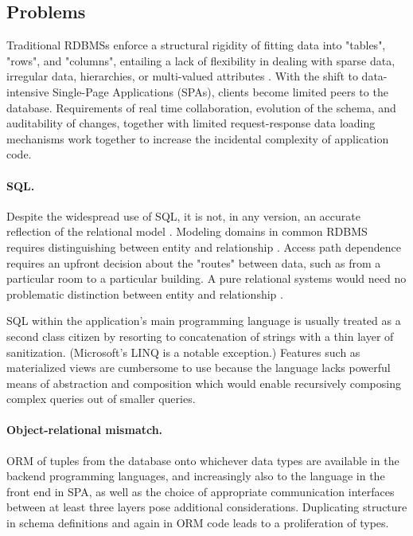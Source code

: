 \subsection{Problems}

Traditional RDBMSs enforce a structural rigidity of fitting data into "tables", "rows", and "columns", entailing a lack of flexibility in dealing with sparse data, irregular data, hierarchies, or multi-valued attributes \cite{hickey2012dbvalue}. With the shift to data-intensive Single-Page Applications (SPAs), clients become limited peers to the database. Requirements of real time collaboration, evolution of the schema, and auditability of changes, together with limited request-response data loading mechanisms work together to increase the incidental complexity of application code.


\paragraph{\gls{SQL}.}
Despite the widespread use of SQL, it is not, in any version, an accurate reflection of the relational model \cite{codd1990relational} \cite{tarpit}.
Modeling domains in common \gls{RDBMS} requires distinguishing between entity and relationship \cite{chen1976entity}. Access path dependence requires an upfront decision about the "routes" between data, such as from a particular room to a particular building. A pure relational systems would need no problematic distinction between entity and relationship \cite{tarpit}.

SQL within the application's main programming language is usually treated as a second class citizen by resorting to concatenation of strings with a thin layer of sanitization. (Microsoft's LINQ \cite{meijer2006linq} is a notable exception.) Features such as materialized views are cumbersome to use because the language lacks powerful means of abstraction and composition \cite{sicp} which would enable recursively composing complex queries out of smaller queries.

\paragraph{Object-relational mismatch.}
\gls{ORM} of tuples from the database onto whichever data types are available in the backend programming languages, and increasingly also to the language in the front end in \gls{SPA}, as well as the choice of appropriate communication interfaces between at least three layers pose additional considerations. Duplicating structure in schema definitions and again in ORM code leads to a proliferation of types.

